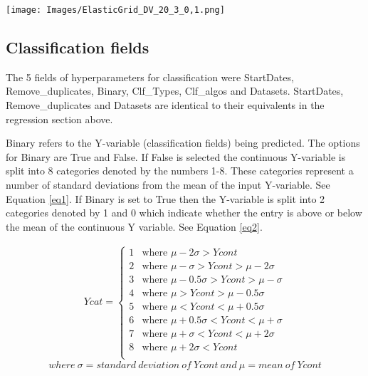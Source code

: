\documentclass[11pt,preprint, authoryear]{elsarticle}
\let\origfigure\figure
\let\endorigfigure\endfigure
\renewenvironment{figure}[1][2] {
    \expandafter\origfigure\expandafter[H]
} {
    \endorigfigure
}
\numberwithin{equation}{section}
\numberwithin{figure}{section}
\numberwithin{table}{section}
\begin{document}
\begin{figure}
\centering
\texttt{[image: Images/ElasticGrid\_DV\_20\_3\_0,1.png]}
\caption{Elastic net: control set}
\end{figure}

\hypertarget{classification-fields}{%
\subsection{Classification fields}\label{classification-fields}}

The 5 fields of hyperparameters for classification were StartDates,
Remove\_duplicates, Binary, Clf\_Types, Clf\_algos and Datasets.
StartDates, Remove\_duplicates and Datasets are identical to their
equivalents in the regression section above.

Binary refers to the Y-variable (classification fields) being predicted.
The options for Binary are True and False. If False is selected the
continuous Y-variable is split into 8 categories denoted by the numbers
1-8. These categories represent a number of standard deviations from the
mean of the input Y-variable. See Equation \ref{eq1}. If Binary is set
to True then the Y-variable is split into 2 categories denoted by 1 and
0 which indicate whether the entry is above or below the mean of the
continuous Y variable. See Equation \ref{eq2}.

\begin{align} 
Ycat=   \left\{ 
\begin{array}{ll} 
      1  &\text{where } \mu-2\sigma>Ycont \label{eq1} \\
      2  &\text{where } \mu-\sigma>Ycont>\mu-2\sigma \\
      3  &\text{where } \mu-0.5\sigma>Ycont>\mu-\sigma \\
      4  &\text{where } \mu>Ycont>\mu-0.5\sigma \\
      5  &\text{where } \mu<Ycont<\mu+0.5\sigma \\
      6  &\text{where } \mu+0.5\sigma<Ycont<\mu+\sigma \\
      7  &\text{where } \mu+\sigma<Ycont<\mu+2\sigma \\
      8  &\text{where } \mu+2\sigma<Ycont \\
\end{array} 
\right. 
\end{align} \[
where \ \sigma = standard \ deviation \ of \ Ycont \ and \ \mu = mean \ of \ Ycont
\]
\end{document}
